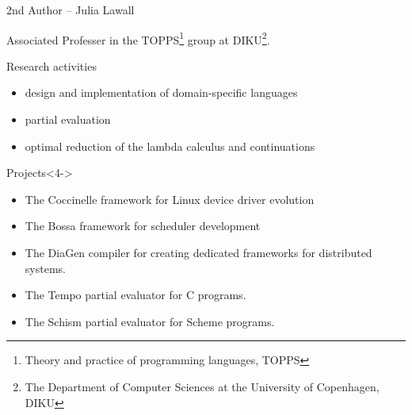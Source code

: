 \begin{frame} {2nd Author -- Julia Lawall}

Associated Professer in the TOPPS\footnote{Theory and practice of programming 
languages, TOPPS} group at DIKU\footnote{The Department of Computer Sciences at 
the University of Copenhagen, DIKU}.

\begin{block}{Research activities}
\begin{itemize}
\item<1-> design and implementation of domain-specific languages
\item<2-> partial evaluation
\item<3-> optimal reduction of the lambda calculus and continuations
\end{itemize}
\end{block}

\begin{block}{Projects}<4->
\begin{itemize}
\item The Coccinelle framework for Linux device driver evolution
\item The Bossa framework for scheduler development
\item The DiaGen compiler for creating dedicated frameworks for distributed systems.
\item The Tempo partial evaluator for C programs.
\item The Schism partial evaluator for Scheme programs.
\end{itemize}
\end{block}

\end{frame}


